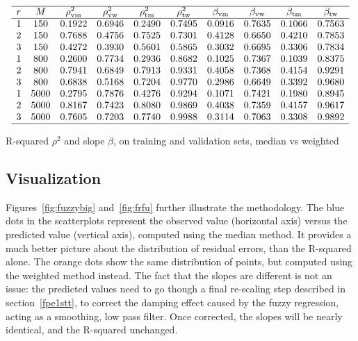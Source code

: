 \documentclass[oneside,10pt]{book}
\begin{document}
\begin{table}[H]
\small
\[
\begin{array}{lccccccccc}
\hline
  r & M & \rho^2_{\text{vm}}  & \rho^2_{\text{vw}} & \rho^2_{\text{tm}}  & \rho^2_{\text{tw}} & \beta_{\text{vm}} & \beta_{\text{vw}} & \beta_{\text{tm}} & \beta_{\text{tw}}\\
\hline
1	&	150	&	0.1922	&	0.6946	&	0.2490	&	0.7495	 & 0.0916 & 0.7635 & 0.1066 & 0.7563\\
2	&	150	&	0.7688	&	0.4756	&	0.7525	&	0.7301	 & 0.4128 & 0.6650 & 0.4210 & 0.7853\\
3	&	150	&	0.4272	&	0.3930	&	0.5601	&	0.5865	 & 0.3032 & 0.6695 & 0.3306 & 0.7834\\
1	&	800	&	0.2600	&	0.7734	&	0.2936	&	0.8682	 & 0.1025 & 0.7367 & 0.1039 & 0.8375\\
2	&	800	&	0.7941	&	0.6849	&	0.7913	&	0.9331	 & 0.4058 & 0.7368 & 0.4154 & 0.9291\\
3	&	800	&	0.6838	&	0.5168	&	0.7204	&	0.9770	 & 0.2986 & 0.6649 & 0.3392 & 0.9680\\
1	&	5000	&	0.2795	&	0.7876	&	0.4276	&	0.9294	 & 0.1071 & 0.7421 & 0.1980 & 0.8945\\
2	&	5000	&	0.8167	&	0.7423	&	0.8080	&	0.9869	 & 0.4038 & 0.7359 & 0.4157 & 0.9617\\
3	&	5000	&	0.7605	&	0.7203	&	0.7740	&	0.9988	 & 0.3114 & 0.7063 & 0.3308 & 0.9892\\
\hline
\end{array}
\]
\caption{\label{futabcorrel}R-squared $\rho^2$ and slope $\beta$, on training and validation sets, median vs weighted}
\end{table}

\subsection{Visualization}

Figures~\ref{fig:fuzzybig} and~\ref{fig:frfu} further illustrate the methodology. The blue dots in the scatterplots represent the observed value (horizontal axis) versus the predicted value (vertical axis), computed using the median method. It provides a much better picture about the distribution of residual errors, than the R-squared alone. The orange dots show the same distribution of points, but computed using the weighted method instead. The fact that the slopes are different is not an issue: the predicted values need to go though a
final re-scaling step described in section~\ref{fpe1stt}, to correct the damping effect caused by the fuzzy regression, acting as a smoothing, low pass filter. Once corrected, the slopes will be nearly identical, and the R-squared unchanged.
\end{document}
